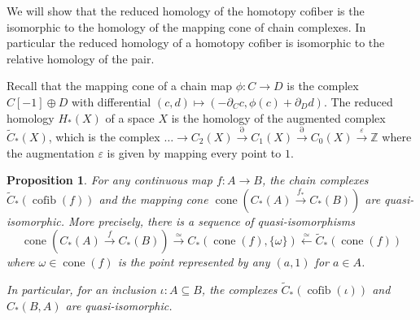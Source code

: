 \documentclass{scrartcl}
\theoremstyle{plain}
\newtheorem{proposition}[theorem]{Proposition}
\theoremstyle{definition}
\newcommand{\Z}{\mathbb Z}
\renewcommand{\epsilon}{\varepsilon}
\renewcommand{\subset}{\subseteq}
\DeclareMathOperator{\cone}{cone}
\DeclareMathOperator{\cofib}{cofib}
\newcommand{\quiso}{\simeq}
\let\xto\xrightarrow
\let\xfrom\xleftarrow
\begin{document}
We will show that the reduced homology of the homotopy cofiber is the isomorphic to the homology of the mapping cone of chain complexes. In particular the reduced homology of a homotopy cofiber is isomorphic to the relative homology of the pair.

Recall that the mapping cone of a chain map $\phi\colon C\to D$ is the complex $C[-1]\oplus D$ with differential $(c, d)\mapsto (-\partial_C c, \phi(c) + \partial_D d)$. The reduced homology $H_*(X)$ of a space $X$ is the homology of the augmented complex $\tilde C_*(X)$, which is the complex $\dots\to C_2(X)\xto{\partial} C_1(X)\xto{\partial} C_0(X)\xto{\epsilon} \Z$ where the augmentation $\epsilon$ is given by mapping every point to $1$. 


\begin{proposition}\label{prop:relative-homology-cofiber}
    For any continuous map $f\colon A\to B$, the chain complexes $\tilde C_*(\cofib(f))$ and the mapping cone $\cone(C_*(A)\xto{f_*} C_*(B))$ are quasi-isomorphic. More precisely, there is a sequence of quasi-isomorphisms 
    \[
        \cone(C_*(A)\xto{f} C_*(B)) \xto{\quiso} C_*(\cone(f), \{\omega\}) \xfrom{\quiso} \tilde C_*(\cone(f))
        \]
    where $\omega\in \cone(f)$ is the point represented by any $(a, 1)$ for $a\in A$.
    
    In particular, for an inclusion $\iota \colon A\subset B$, the complexes $\tilde C_*(\cofib(\iota))$ and $C_*(B, A)$ are quasi-isomorphic. 
\end{proposition}
\end{document}
